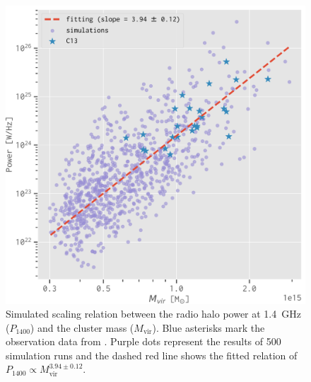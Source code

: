 \documentclass[twocolumn]{aastex62}
\newcommand{\R}[1]{\mathrm{#1}}
\begin{document}
\begin{figure}
  \centering
  \includegraphics[width=\columnwidth]{halo-power-mvir}
  \caption{\label{fig:halo-power}%
    Simulated scaling relation between the radio halo power at
    \SI{1.4}{\GHz} ($P_{1400}$) and the cluster mass ($M_{\R{vir}}$).
    Blue asterisks mark the observation data from \citet{cassano2013}.
    Purple dots represent the results of 500 simulation runs
    and the dashed red line shows the fitted relation of
    $P_{1400} \propto M_{\R{vir}}^{3.94 \pm 0.12}$.
  }
\end{figure}
\end{document}
